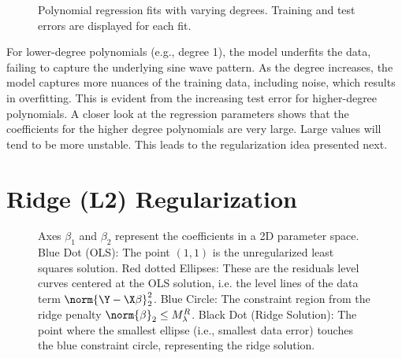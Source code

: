 \begin{figure}[h]\centering
\caption{Polynomial regression fits with varying degrees. Training and test errors are displayed for each fit.}\label{fig:ch4-poly-overfit}
\end{figure}

For lower-degree polynomials (e.g., degree 1), the model underfits the data,
failing to capture the underlying sine wave pattern. As the degree increases,
the model captures more nuances of the training data, including noise, which
results in overfitting. This is evident from the increasing test error for higher-degree polynomials.
A closer look at the regression parameters shows that the coefficients for
the higher degree polynomials are very large. Large values will tend to be more
unstable. This leads to the regularization idea presented next.

\section{Ridge (L2) Regularization}\label{sec:ch4-ridge}

\begin{figure}[h]\centering
\caption{Axes $\beta_1$ and $\beta_2$ represent the coefficients in a 2D parameter space. Blue Dot (OLS): The point $(1, 1)$ is the unregularized least squares solution. Red dotted Ellipses: These are the residuals level curves centered at the OLS solution, i.e. the level lines of the data term $\norm{\Y - \X \beta}_2^2$. Blue Circle: The constraint region from the ridge penalty $\norm{\beta}_2 \le M_\lambda^R$. Black Dot (Ridge Solution): The point where the smallest ellipse (i.e., smallest data error) touches the blue constraint circle, representing the ridge solution.}\label{fig:ch4-ridge-geometry}
\end{figure}

